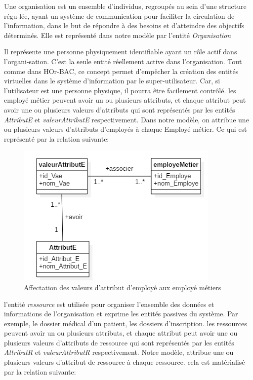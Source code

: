 \label{sectionOrganisation} 
Une organisation est un ensemble d'individus, regroupés au sein d'une structure régu-lée, ayant un système de communication pour faciliter la circulation de l'information, dans le but de répondre à des besoins et d'atteindre des objectifs déterminés. Elle est représenté dans notre modèle par l'entité \textit{Organisation}

\label{sectionEmployeMetier} 
Il représente une personne physiquement identifiable ayant un rôle actif dans l'organi-sation. C'est la seule entité réellement active dans l'organisation. Tout comme dans HOr-BAC, ce concept permet d'empêcher la création des entités virtuelles dans le système d'information par le super-utilisateur. Car, si l'utilisateur est une personne physique, il pourra être facilement contrôlé. les employé métier peuvent avoir un ou plusieurs attributs, et chaque attribut peut avoir une ou plusieurs valeurs d'attributs qui sont représentés par les entités \textit{AttributE} et \textit{valeurAttributE} respectivement. Dans notre modèle, on attribue une ou plusieurs valeurs d'attributs d'employés à chaque Employé métier. Ce qui est représenté par la relation suivante: %

\begin{figure}[h!]
    \centering
		\includegraphics[scale=0.7]{chap3/images/employe_attribut.png}
    \caption{Affectation des valeurs d'attribut d'employé aux employé métiers}
	 \label{figemploye}
\end{figure} 

\label{sectionRessource}

l'entité \textit{ressource} est utilisée pour organiser l'ensemble des données et informations de l'organisation et exprime les entités passives du système. Par exemple, le dossier médical d'un patient, les dossiers d'inscription. les ressources peuvent avoir un ou plusieurs attributs, et chaque attribut peut avoir une ou plusieurs valeurs d'attributs de ressource qui sont représentés par les entités \textit{AttributR} et \textit{valeurAttributR} respectivement. Notre modèle, attribue une ou plusieurs valeurs d'attribut de ressource à chaque ressource. cela est matérialisé par la relation suivante:

